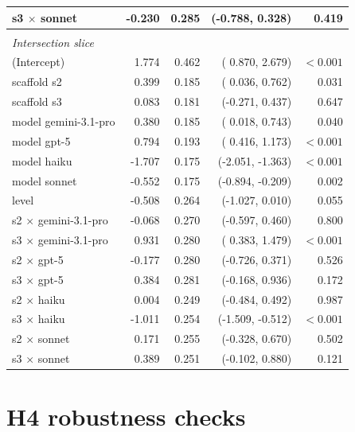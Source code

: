 \documentclass[10pt]{article} %
\begin{document}
\begin{table}[h]
\begin{center}
\begin{tabular}{lrrrr}
        s3 $\times$ sonnet         & -0.230 & 0.285 & (-0.788,  0.328) & 0.419 \\
        \hline \\
        \multicolumn{5}{l}{\textit{Intersection slice}} \\
        (Intercept)                &  1.774 & 0.462 & ( 0.870,  2.679) & $<0.001$ \\
        scaffold s2                &  0.399 & 0.185 & ( 0.036,  0.762) & 0.031 \\
        scaffold s3                &  0.083 & 0.181 & (-0.271,  0.437) & 0.647 \\
        model gemini-3.1-pro       &  0.380 & 0.185 & ( 0.018,  0.743) & 0.040 \\
        model gpt-5                &  0.794 & 0.193 & ( 0.416,  1.173) & $<0.001$ \\
        model haiku                & -1.707 & 0.175 & (-2.051, -1.363) & $<0.001$ \\
        model sonnet               & -0.552 & 0.175 & (-0.894, -0.209) & 0.002 \\
        level                      & -0.508 & 0.264 & (-1.027,  0.010) & 0.055 \\
        s2 $\times$ gemini-3.1-pro & -0.068 & 0.270 & (-0.597,  0.460) & 0.800 \\
        s3 $\times$ gemini-3.1-pro &  0.931 & 0.280 & ( 0.383,  1.479) & $<0.001$ \\
        s2 $\times$ gpt-5          & -0.177 & 0.280 & (-0.726,  0.371) & 0.526 \\
        s3 $\times$ gpt-5          &  0.384 & 0.281 & (-0.168,  0.936) & 0.172 \\
        s2 $\times$ haiku          &  0.004 & 0.249 & (-0.484,  0.492) & 0.987 \\
        s3 $\times$ haiku          & -1.011 & 0.254 & (-1.509, -0.512) & $<0.001$ \\
        s2 $\times$ sonnet         &  0.171 & 0.255 & (-0.328,  0.670) & 0.502 \\
        s3 $\times$ sonnet         &  0.389 & 0.251 & (-0.102,  0.880) & 0.121 \\
    \end{tabular}
    \end{center}
    \end{table}

\section{H4 robustness checks}\label{app:h4_robustness}
\end{document}
